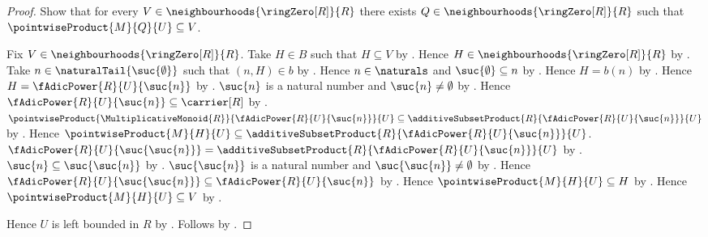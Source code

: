 \begin{proof}
    Show that for every $V\in\neighbourhoods{\ringZero[R]}{R}$ there
        exists $Q\in\neighbourhoods{\ringZero[R]}{R}$ such that
            $\pointwiseProduct{M}{Q}{U}\subseteq V$.
    \begin{subproof}
        Fix $V\in\neighbourhoods{\ringZero[R]}{R}$.
        Take $H\in B$ such that $H\subseteq V$ by
            .
        Hence $H\in\neighbourhoods{\ringZero[R]}{R}$ by .
        Take $n\in\naturalTail{\suc{\emptyset}}$ such that $(n,H)\in b$ by
            .
        Hence $n\in\naturals$ and $\suc{\emptyset}\subseteq n$ by
            .
        Hence $H=b(n)$ by .
        Hence $H=\fAdicPower{R}{U}{\suc{n}}$ by
            .
        $\suc{n}$ is a natural number and $\suc{n}\neq\emptyset$ by
            .
        Hence $\fAdicPower{R}{U}{\suc{n}}\subseteq\carrier[R]$ by
            .
        $\pointwiseProduct{\MultiplicativeMonoid{R}}{
                \fAdicPower{R}{U}{\suc{n}}}{U}
            \subseteq\additiveSubsetProduct{R}{
                \fAdicPower{R}{U}{\suc{n}}}{U}$ by
            .
        Hence $\pointwiseProduct{M}{H}{U}
            \subseteq\additiveSubsetProduct{R}{
                \fAdicPower{R}{U}{\suc{n}}}{U}$.
        $\fAdicPower{R}{U}{\suc{\suc{n}}}
            =\additiveSubsetProduct{R}{
                \fAdicPower{R}{U}{\suc{n}}}{U}$ by
            .
        $\suc{n}\subseteq\suc{\suc{n}}$ by
            .
        $\suc{\suc{n}}$ is a natural number and
            $\suc{\suc{n}}\neq\emptyset$ by
            .
        Hence $\fAdicPower{R}{U}{\suc{\suc{n}}}
            \subseteq\fAdicPower{R}{U}{\suc{n}}$ by
            .
        Hence $\pointwiseProduct{M}{H}{U}\subseteq H$ by
            .
        Hence $\pointwiseProduct{M}{H}{U}\subseteq V$ by
            .
    \end{subproof}
    Hence $U$ is left bounded in $R$ by .
    Follows by .
\end{proof}

